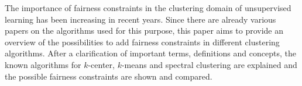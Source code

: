 The importance of fairness constraints in the clustering domain of unsupervised learning has been increasing in recent years. Since there are already various papers on the algorithms used for this purpose, this paper aims to provide an overview of the possibilities to add fairness constraints in different clustering algorithms. After a clarification of important terms, definitions and concepts, the known algorithms for $k$-center, $k$-means and spectral clustering are explained and the possible fairness constraints are shown and compared.